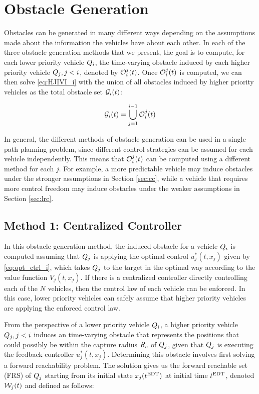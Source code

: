 \section{Obstacle Generation \label{sec:obs_gen}}
Obstacles can be generated in many different ways depending on the assumptions made about the information the vehicles have about each other. In each of the three obstacle generation methods that we present, the goal is to compute, for each lower priority vehicle $Q_i$, the time-varying obstacle induced by each higher priority vehicle $Q_j, j < i$, denoted by $\mathcal{O}_i^j(t)$. Once $\mathcal{O}_i^j(t)$ is computed, we can then solve \eqref{eq:HJIVI_i} with the union of all obstacles induced by higher priority vehicles as the total obstacle set $\mathcal{G}_i(t)$:

\begin{equation}
\mathcal{G}_i(t) = \bigcup_{j=1}^{i-1}\mathcal{O}_i^j(t)
\end{equation}

In general, the different methods of obstacle generation can be used in a single path planning problem, since different control strategies can be assumed for each vehicle independently. This means that $\mathcal{O}_i^j(t)$ can be computed using a different method for each $j$. For example, a more predictable vehicle may induce obstacles under the stronger assumptions in Section \ref{sec:cc}, while a vehicle that requires more control freedom may induce obstacles under the weaker assumptions in Section \ref{sec:lrc}.

\subsection{Method 1: Centralized Controller \label{sec:cc}}
In this obstacle generation method, the induced obstacle for a vehicle $Q_i$ is computed assuming that $Q_j$ is applying the optimal control $u_j^*(t, x_j)$ given by \eqref{eq:opt_ctrl_i}, which takes $Q_j$ to the target in the optimal way according to the value function $V_j(t, x_j)$. If there is a centralized controller directly controlling each of the $N$ vehicles, then the control law of each vehicle can be enforced. In this case, lower priority vehicles can safely assume that higher priority vehicles are applying the enforced control law. 

From the perspective of a lower priority vehicle $Q_i$, a higher priority vehicle $Q_j, j < i$ induces an time-varying obstacle that represents the positions that could possibly be within the capture radius $R_c$ of $Q_j$, given that $Q_j$ is executing the feedback controller $u_j^*(t, x_j)$. Determining this obstacle involves first solving a forward reachability problem. The solution gives us the forward reachable set (FRS) of $Q_j$ starting from its initial state $x_j(t^\text{EDT})$ at initial time $t^\text{EDT}$, denoted $\mathcal{W}_j(t)$ and defined as follows:

